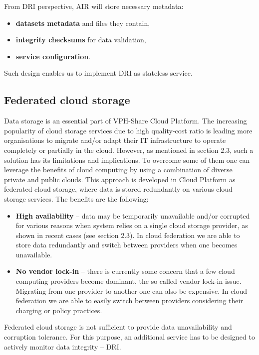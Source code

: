 From DRI perspective, AIR will store necessary metadata:

\begin{itemize}
	\item \textbf{datasets metadata} and files they contain,
	\item \textbf{integrity checksums} for data validation,
	\item \textbf{service configuration}.
\end{itemize}

Such design enables us to implement DRI as stateless service.

\subsection{Federated cloud storage}
\label{federated-cloud-storage}
Data storage is an essential part of VPH-Share Cloud Platform. The increasing
popularity of cloud storage services due to high quality-cost ratio is leading
more organisations to migrate and/or adapt their IT infrastructure to operate
completely or partially in the cloud. However, as mentioned in section 2.3, 
such a solution has its limitations and implications. To overcome some of 
them one can leverage the benefits of cloud computing by using a combination 
of diverse private and public clouds. This approach is developed in Cloud
Platform as federated cloud storage, where data is stored redundantly on 
various cloud storage services. The benefits are the following:

\begin{itemize}
	\item \textbf{High availability} -- data may be temporarily unavailable 
	and/or corrupted for various reasons when system relies on a single cloud 
	storage provider, as shown in recent cases (see section 2.3). In cloud
	federation we are able to store data redundantly and switch between 
	providers when one becomes unavailable.
	\item \textbf{No vendor lock-in} -- there is currently some concern that 
	a few cloud computing providers become dominant, the so called vendor 
	lock-in issue. Migrating from one provider to another one can also be
	expensive. In cloud federation we are able to easily switch between
	providers considering their charging or policy practices.
\end{itemize}

Federated cloud storage is not sufficient to provide data unavailability 
and corruption tolerance. For this purpose, an additional service
has to be designed to actively monitor data integrity -- DRI.\\

